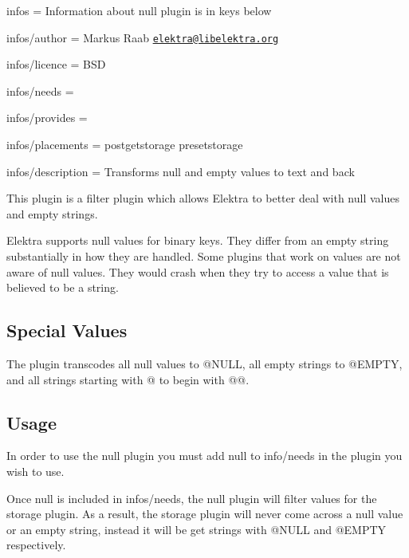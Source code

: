 
\begin{DoxyItemize}
\item infos = Information about null plugin is in keys below
\item infos/author = Markus Raab \href{mailto:elektra@libelektra.org}{\tt elektra@libelektra.\+org}
\item infos/licence = B\+S\+D
\item infos/needs =
\item infos/provides =
\item infos/placements = postgetstorage presetstorage
\item infos/description = Transforms null and empty values to text and back
\end{DoxyItemize}

This plugin is a filter plugin which allows Elektra to better deal with null values and empty strings.

Elektra supports null values for binary keys. They differ from an empty string substantially in how they are handled. Some plugins that work on values are not aware of null values. They would crash when they try to access a value that is believed to be a string.

\subsection*{Special Values}

The plugin transcodes all null values to {\ttfamily @N\+U\+L\+L}, all empty strings to {\ttfamily @E\+M\+P\+T\+Y}, and all strings starting with {\ttfamily @} to begin with {\ttfamily @@}.

\subsection*{Usage}

In order to use the {\ttfamily null} plugin you must add {\ttfamily null} to {\ttfamily info/needs} in the plugin you wish to use.

Once {\ttfamily null} is included in {\ttfamily infos/needs}, the null plugin will filter values for the storage plugin. As a result, the storage plugin will never come across a null value or an empty string, instead it will be get strings with {\ttfamily @N\+U\+L\+L} and {\ttfamily @E\+M\+P\+T\+Y} respectively. 